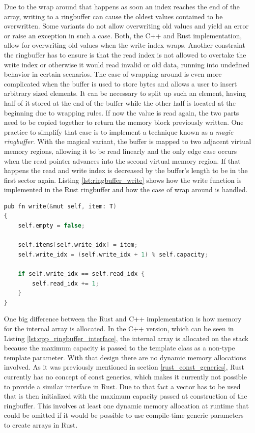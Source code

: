 Due to the wrap around that happens as soon an index reaches the end of the array, writing to a ringbuffer can cause the oldest values contained to be overwritten. Some variants do not allow overwriting old values and yield an error or raise an exception in such a case. Both, the C++ and Rust implementation, allow for overwriting old values when the write index wraps. Another constraint the ringbuffer has to ensure is that the read index is not allowed to overtake the write index or otherwise it would read invalid or old data, running into undefined behavior in certain scenarios. The case of wrapping around is even more complicated when the buffer is used to store bytes and allows a user to insert arbitrary sized elements. It can be necessary to split up such an element, having half of it stored at the end of the buffer while the other half is located at the beginning due to wrapping rules. If now the value is read again, the two parts need to be copied together to return the memory block previously written. One practice to simplify that case is to implement a technique known as a \textit{magic ringbuffer}. With the magical variant, the buffer is mapped to two adjacent virtual memory regions, allowing it to be read linearly and the only edge case occurs when the read pointer advances into the second virtual memory region. If that happens the read and write index is decreased by the buffer's length to be in the first sector again. Listing \ref{lst:ringbuffer_write} shows how the write function is implemented in the Rust ringbuffer and how the case of wrap around is handled.\\

\begin{lstlisting}[caption={Write function of the Rust ringbuffer showing how the wrap around case is handled}, label={lst:ringbuffer_write}, language={C++}]
pub fn write(&mut self, item: T) 
{
	self.empty = false;
	
	self.items[self.write_idx] = item;
	self.write_idx = (self.write_idx + 1) % self.capacity;
	
	if self.write_idx == self.read_idx {
		self.read_idx += 1;
	}
}
\end{lstlisting}

\noindent
One big difference between the Rust and C++ implementation is how memory for the internal array is allocated. In the C++ version, which can be seen in Listing \ref{lst:cpp_ringbuffer_interface}, the internal array is allocated on the stack because the maximum capacity is passed to the template class as a non-type template parameter. With that design there are no dynamic memory allocations involved.  As it was previously mentioned in section \ref{rust_const_generics}, Rust currently has no concept of const generics, which makes it currently not possible to provide a similar interface in Rust. Due to that fact a vector has to be used that is then initialized with the maximum capacity passed at construction of the ringbuffer. This involves at least one dynamic memory allocation at runtime that could be omitted if it would be possible to use compile-time generic parameters to create arrays in Rust.\\

